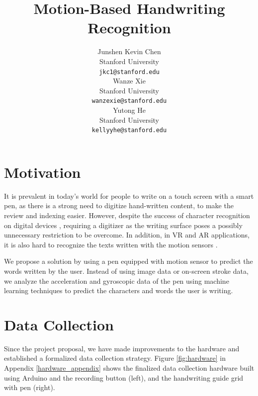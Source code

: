 \documentclass{article}
\title{Motion-Based Handwriting Recognition }
\author{
  Junshen Kevin Chen \\
  Stanford University\\
  \texttt{jkc1@stanford.edu} \\
   \And
  Wanze Xie \\
  Stanford University\\
  \texttt{wanzexie@stanford.edu} \\
    \And
  Yutong He \\
  Stanford University\\
  \texttt{kellyyhe@stanford.edu} \\
}
\begin{document}
\maketitle



\vspace{-15pt}
\section{Motivation}

It is prevalent in today’s world for people to write on a touch screen with a smart pen, as there is a strong need to digitize hand-written content, to make the review and indexing easier. However, despite the success of character recognition on digital devices \cite{bib1} \cite{bib2} \cite{bib3}, requiring a digitizer as the writing surface poses a possibly unnecessary restriction to be overcome. In addition, in VR and AR applications, it is also hard to recognize the texts written with the motion sensors \cite{bib4} \cite{bib5}.

We propose a solution by using a pen equipped with motion sensor to predict the words written by the user. Instead of using image data or on-screen stroke data, we analyze the acceleration and gyroscopic data of the pen using machine learning techniques to predict the characters and words the user is writing. 


\section{Data Collection}

Since the project proposal, we have made improvements to the hardware and established a formalized data collection strategy. Figure \ref{fig:hardware} in Appendix \ref{hardware_appendix} shows the finalized data collection hardware built using Arduino and the recording button (left), and the handwriting guide grid with pen (right).
\end{document}

